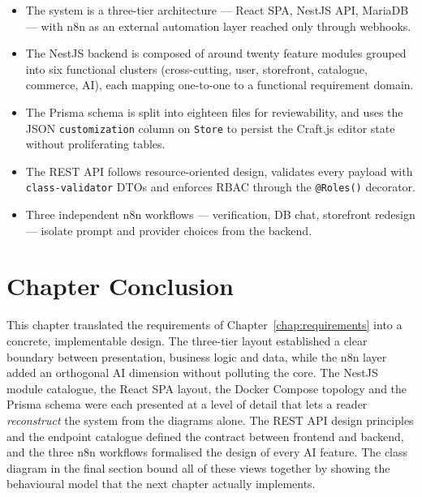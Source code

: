 \documentclass[12pt, a4paper, oneside]{report}
\newenvironment{keytakeaways}{%
  \par\bigskip
  \begin{mdframed}[
    backgroundcolor=cheebolightgray,
    linecolor=cheeboblue,
    linewidth=3pt,
    topline=false,
    bottomline=false,
    rightline=false,
    innerleftmargin=14pt,
    innerrightmargin=14pt,
    innertopmargin=10pt,
    innerbottommargin=10pt
  ]
  \noindent{\bfseries\color{cheeboblue}\large Key Takeaways}\par
  \vspace{4pt}
  \small
}{%
  \end{mdframed}
}
\begin{document}
\begin{keytakeaways}
\begin{itemize}[leftmargin=*,itemsep=2pt]
  \item The system is a three-tier architecture --- React SPA,
        NestJS API, MariaDB --- with n8n as an external automation
        layer reached only through webhooks.
  \item The NestJS backend is composed of around twenty feature
        modules grouped into six functional clusters
        (cross-cutting, user, storefront, catalogue, commerce,
        AI), each mapping one-to-one to a functional requirement
        domain.
  \item The Prisma schema is split into eighteen files for
        reviewability, and uses the JSON \texttt{customization}
        column on \texttt{Store} to persist the Craft.js editor
        state without proliferating tables.
  \item The REST API follows resource-oriented design, validates
        every payload with \texttt{class-validator} DTOs and
        enforces RBAC through the \texttt{@Roles()} decorator.
  \item Three independent n8n workflows --- verification, DB
        chat, storefront redesign --- isolate prompt and provider
        choices from the backend.
\end{itemize}
\end{keytakeaways}

\section*{Chapter Conclusion}

This chapter translated the requirements of Chapter~\ref{chap:requirements}
into a concrete, implementable design. The three-tier layout
established a clear boundary between presentation, business logic
and data, while the n8n layer added an orthogonal AI dimension
without polluting the core. The NestJS module catalogue, the React
SPA layout, the Docker Compose topology and the Prisma schema were
each presented at a level of detail that lets a reader
\emph{reconstruct} the system from the diagrams alone. The REST
API design principles and the endpoint catalogue defined the
contract between frontend and backend, and the three n8n workflows
formalised the design of every AI feature. The class diagram in
the final section bound all of these views together by showing the
behavioural model that the next chapter actually implements.
\end{document}
